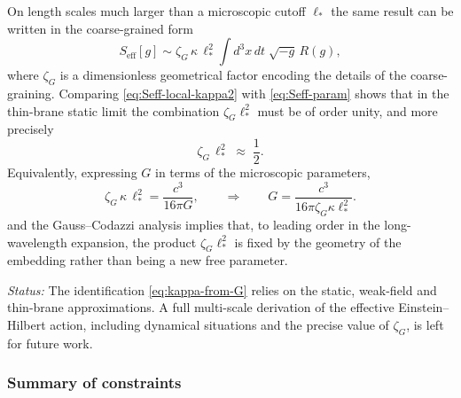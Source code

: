 On length scales much larger than a microscopic cutoff $\ell_\ast$ the
same result can be written in the coarse-grained form
%
\begin{equation}
  S_{\mathrm{eff}}[g]
  \sim \zeta_G \,\kappa \,\ell_\ast^2 \int d^3x\,dt\; \sqrt{-g}\, R(g),
  \label{eq:Seff-param}
\end{equation}
%
where $\zeta_G$ is a dimensionless geometrical factor encoding the
details of the coarse-graining.
Comparing \eqref{eq:Seff-local-kappa2} with \eqref{eq:Seff-param}
shows that in the thin-brane static limit the combination
$\zeta_G \ell_\ast^2$ must be of order unity, and more precisely
%
\begin{equation}
  \zeta_G \,\ell_\ast^2 \;\approx\; \frac{1}{2}.
\end{equation}
%
Equivalently, expressing $G$ in terms of the microscopic parameters,
%
\begin{equation}
  \zeta_G \,\kappa \,\ell_\ast^2
  = \frac{c^3}{16\pi G},
  \qquad\Rightarrow\qquad
  G = \frac{c^3}{16\pi \zeta_G \kappa \ell_\ast^2}.
  \label{eq:G-from-brane}
\end{equation}
%
and the Gauss--Codazzi analysis implies that, to leading order in
the long-wavelength expansion, the product $\zeta_G \ell_\ast^2$
is fixed by the geometry of the embedding rather than being a new
free parameter.

\textit{Status:} The identification \eqref{eq:kappa-from-G}
relies on the static, weak-field and thin-brane approximations.
A full multi-scale derivation of the effective Einstein--Hilbert
action, including dynamical situations and the precise value of
$\zeta_G$, is left for future work.

\subsubsection{Summary of constraints}

